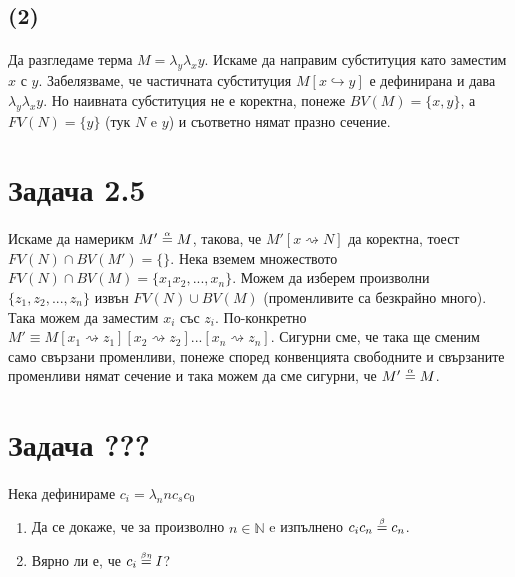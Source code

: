 \documentclass[12pt]{article}
\begin{document}
\begin{enumerate}
\subsection*{(2)}
\paragraph*{}
Да разгледаме терма $M = \lambda_y \lambda_x y$. Искаме да направим субституция като заместим $x$ с $y$. Забелязваме, че частичната субституция $M[x \hookrightarrow y]$ е дефинирана и дава $\lambda_y \lambda_x y$. Но наивната субституция не е коректна, понеже $BV(M) = \{ x, y \}$, а $FV(N) = \{ y \}$ (тук $N$ e $y$) и съответно нямат празно сечение.

\end{enumerate}

\section*{Задача 2.5}
\paragraph*{}
Искаме да намерикм $M' \alphaeq M$, такова, че $M'[x \rightsquigarrow N]$ да коректна, тоест $FV(N) \cap BV(M') = \{ \}$. Нека вземем множеството $FV(N) \cap BV(M) = \{ x_1 x_2, ..., x_n\}$. Можем да изберем произволни $\{ z_1, z_2, ..., z_n \}$ извън $FV(N) \cup BV(M)$ (променливите са безкрайно много). Така можем да заместим $x_i$ със $z_i$. По-конкретно $M' \equiv M[x_1 \rightsquigarrow z_1][x_2 \rightsquigarrow z_2]...[x_n \rightsquigarrow z_n]$. Сигурни сме, че така ще сменим само свързани променливи, понеже според конвенцията свободните и свързаните променливи нямат сечение и така можем да сме сигурни, че $M' \alphaeq M$.

\section*{Задача ???}
\paragraph{}
Нека дефинираме $c_i = \lambda_n n c_s c_0$
\begin{enumerate}
	\item Да се докаже, че за произволно $n \in \mathbb{N}$ e изпълнено $c_i c_n \betaeq c_n$.
	\item Вярно ли е, че $c_i \betaetaeq I$?
\end{enumerate}
\end{document}
